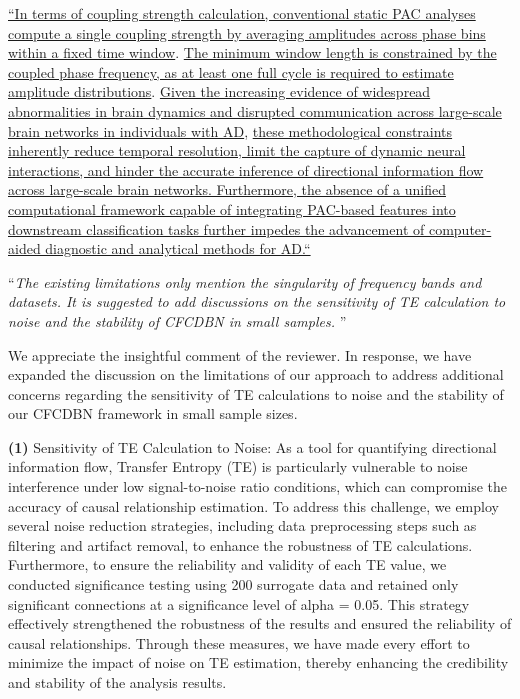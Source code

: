 \documentclass[12pt,technote,onecolumn]{IEEEtran}
\begin{document}
\uline{``In terms of coupling strength calculation, conventional static PAC analyses compute a single coupling strength by averaging amplitudes across phase bins within a fixed time window}\cite{tort2010measuring}. \uline{The minimum window length is constrained by the coupled phase frequency, as at least one full cycle is required to estimate amplitude distributions}\cite{voytek2013method}. 
\uline{Given the increasing evidence of widespread abnormalities in brain dynamics and disrupted communication across large-scale brain networks in individuals with AD}\cite{wang2023analysis,cui2020disrupted,sylvester2012functional}, \uline{these methodological constraints inherently reduce temporal resolution, limit the capture of dynamic neural interactions, and hinder the accurate inference of directional information flow across large-scale brain networks. Furthermore, the absence of a unified computational framework capable of integrating PAC-based features into downstream classification tasks further impedes the advancement of computer-aided diagnostic and analytical methods for AD.“}

\vspace{4mm} 

 ``{\it The existing limitations only mention the singularity of frequency bands and datasets. It is suggested to add discussions on the sensitivity of TE calculation to noise and the stability of CFCDBN in small samples.
}''
\vspace{1mm}


We appreciate the insightful comment of the reviewer. In response, we have expanded the discussion on the limitations of our approach to address additional concerns regarding the sensitivity of TE calculations to noise and the stability of our CFCDBN framework in small sample sizes. 

\textbf{(1)} Sensitivity of TE Calculation to Noise:
As a tool for quantifying directional information flow, Transfer Entropy (TE) is particularly vulnerable to noise interference under low signal-to-noise ratio conditions, which can compromise the accuracy of causal relationship estimation. To address this challenge, we employ several noise reduction strategies, including data preprocessing steps such as filtering and artifact removal, to enhance the robustness of TE calculations. Furthermore, to ensure the reliability and validity of each TE value, we conducted significance testing using 200 surrogate data and retained only significant connections at a significance level of alpha = 0.05. This strategy effectively strengthened the robustness of the results and ensured the reliability of causal relationships. Through these measures, we have made every effort to minimize the impact of noise on TE estimation, thereby enhancing the credibility and stability of the analysis results.
\end{document}
